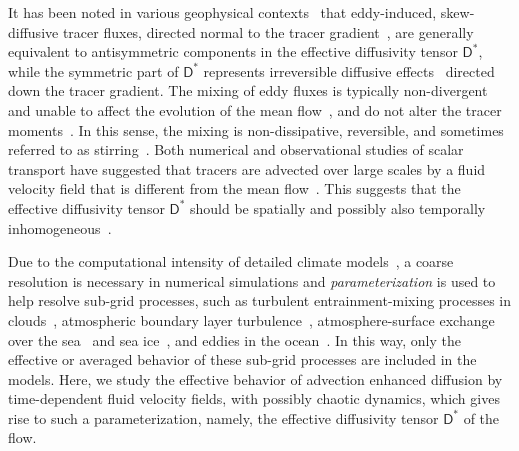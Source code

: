 \documentclass[leqno,onefignum,onetabnum]{siamltex1213}
\newcommand{\Dm}{\mathsf{D}}
\begin{document}
It has been noted in various geophysical
contexts~\cite{Plumb:JAS:1979,Plumb:JAS:1987} that eddy-induced,
skew-diffusive tracer fluxes, directed normal to the tracer
gradient~\cite{Middleton:JPO:5840223}, are generally equivalent to
antisymmetric components in the effective 
diffusivity tensor $\Dm^*$, while the symmetric part of $\Dm^*$
represents irreversible diffusive
effects~\cite{Redi:JPO:1982:1154,Solomon:OGR:1971:233,Griffies:JPO:1998}
directed down the tracer gradient. The mixing of eddy fluxes is
typically non-divergent and unable to affect the evolution of the mean
flow~\cite{Middleton:JPO:5840223}, and do not alter the tracer
moments~\cite{Griffies:JPO:1998}. In this sense, the 
mixing is non-dissipative, reversible, and sometimes referred to as
stirring~\cite{Eckart:JMR:1948,Griffies:JPO:1998}. Both numerical and
observational studies of scalar transport have suggested that tracers
are advected over large scales by a fluid velocity field that is
different from the mean flow~\cite{Pavliotis:PHD_Thesis}. This
suggests that the effective diffusivity tensor $\Dm^*$ should be
spatially and possibly also temporally
inhomogeneous~\cite{Pavliotis:PHD_Thesis}. 





Due to the computational intensity of detailed climate
models~\cite{Griffies:2003:10.1007,Washington:1986:9780935702521,Neelin:2010:CCCM},
a coarse resolution is necessary in numerical simulations and
\emph{parameterization} is used to help resolve sub-grid
processes, such as turbulent 
entrainment-mixing processes in clouds~\cite{Lu:JGR:D50094},
atmospheric boundary layer turbulence~\cite{Bretherton:JOC:5655449},
atmosphere-surface exchange over the
sea~\cite{Fairall:1996:JGRC6562} and sea
ice~\cite{Sorensen:TC:2014,Andreas:2010:QJ618,Andreas:JH:2010,Vihma:2014:9923},
and eddies in the ocean~\cite{McDougall:2001:book,Gent:JPO:1995}. In
this way, only the effective or averaged behavior of these sub-grid
processes are included in the models. Here, we study the effective
behavior of advection enhanced diffusion by time-dependent fluid
velocity fields, with possibly chaotic dynamics, which gives rise to
such a parameterization, namely, the effective diffusivity tensor
$\Dm^*$ of the flow. 
\end{document}
